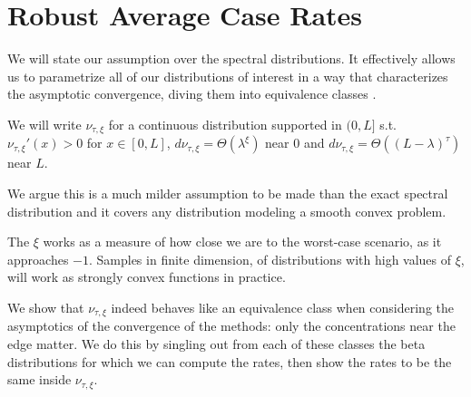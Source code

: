 \documentclass{article}
\begin{document}
\section{Robust Average Case Rates} \label{section: robust average}
We will state our assumption over the spectral distributions. It effectively allows us to parametrize all of our distributions of interest in a way that characterizes the asymptotic convergence, diving them into equivalence classes .

\begin{assumption}
We will write $\nu_{\tau,\xi}$ for a continuous distribution supported in $(0,L]$ s.t. $\nu_{\tau,\xi}'(x)>0$ for $x\in [0,L]$, $d\nu_{\tau,\xi}=\Theta( \lambda^\xi)$ near $0$ and $d\nu_{\tau,\xi}=\Theta( (L-\lambda)^\tau)$ near $L$. 
\label{assumption}
\end{assumption}

We argue this is a much milder assumption to be made than the exact spectral distribution and it covers any distribution modeling a smooth convex problem. 


The $\xi$ works as a measure of how close we are to the worst-case scenario, as it approaches $-1$. Samples in finite dimension, of distributions with high values of $\xi$, will work as strongly convex functions in practice.


We show that $\nu_{\tau,\xi}$ indeed behaves like an equivalence class when considering the asymptotics of the convergence of the methods: only the concentrations near the edge matter. We do this by singling out from each of these classes the beta distributions for which we can compute the rates, then show the rates to be the same inside $\nu_{\tau,\xi}$.
\end{document}
